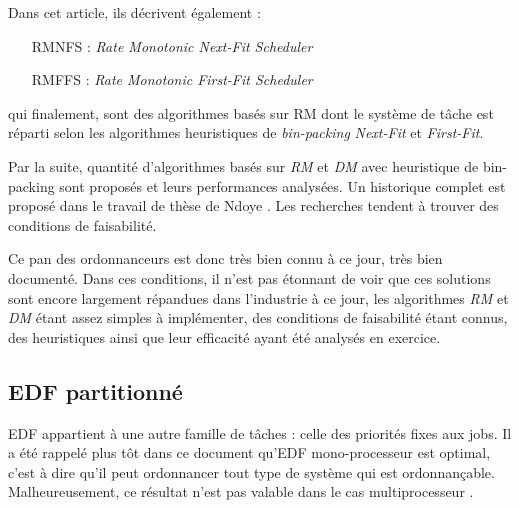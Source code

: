 \documentclass[11pt,a4paper,oneside]{report}
\begin{document}
Dans cet article, ils décrivent également :\\
\begin{itemize}
	\item[RMNFS] : \textit{Rate Monotonic Next-Fit Scheduler}
	\item[RMFFS] : \textit{Rate Monotonic First-Fit Scheduler}
\end{itemize}
\vspace{1em}
qui finalement, sont des algorithmes basés sur RM dont le système de tâche est 
réparti selon les algorithmes heuristiques de \textit{bin-packing} \textit{Next-Fit} et \textit{First-Fit}.

Par la suite, quantité d'algorithmes basés sur \textit{RM} et \textit{DM} avec 
heuristique de bin-packing sont proposés et leurs performances analysées. 
Un historique complet est proposé dans le travail de thèse de Ndoye \cite{ndoye_ordonnancement_2014}. 
Les recherches tendent à trouver des conditions de faisabilité.

Ce pan des ordonnanceurs est donc très bien connu à ce jour, très bien documenté. 
Dans ces conditions, il n'est pas étonnant de voir que ces solutions sont encore largement 
répandues dans l'industrie à ce jour, les algorithmes \textit{RM} et \textit{DM} 
étant assez simples à implémenter, des conditions de faisabilité étant connus, 
des heuristiques ainsi que leur efficacité ayant été analysés en exercice.\\

\subsection{EDF partitionné}
EDF appartient à une autre famille de tâches : celle des priorités fixes aux jobs. 
Il a été rappelé plus tôt dans ce document qu'EDF mono-processeur est optimal, 
c'est à dire qu'il peut ordonnancer tout type de système qui est ordonnançable. 
Malheureusement, ce résultat n'est pas valable dans le cas multiprocesseur \cite{dertouzos_multiprocessor_1989}.\\
\end{document}

